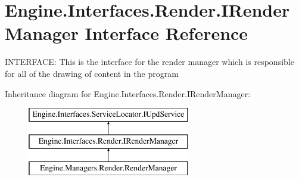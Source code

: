 \hypertarget{a00458}{}\section{Engine.\+Interfaces.\+Render.\+I\+Render\+Manager Interface Reference}
\label{a00458}


I\+N\+T\+E\+R\+F\+A\+CE\+: This is the interface for the render manager which is responsible for all of the drawing of content in the program  


Inheritance diagram for Engine.\+Interfaces.\+Render.\+I\+Render\+Manager\+:\begin{figure}[H]
\begin{center}
\leavevmode
\includegraphics[height=3.000000cm]{da/d65/a00458}
\end{center}
\end{figure}

